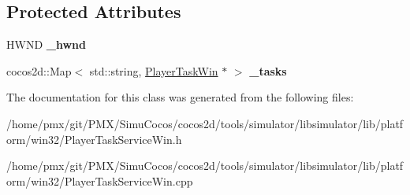 \subsection*{Protected Attributes}
\begin{DoxyCompactItemize}
\item 
\mbox{\label{classPlayerTaskServiceWin_ab4058e50ed13e898d84d9e83a9a33dbf}} 
H\+W\+ND {\bfseries \+\_\+hwnd}
\item 
\mbox{\label{classPlayerTaskServiceWin_a0d4bc832aa5e25b21f968334e3ce92f3}} 
cocos2d\+::\+Map$<$ std\+::string, \hyperlink{classPlayerTaskWin}{Player\+Task\+Win} $\ast$ $>$ {\bfseries \+\_\+tasks}
\end{DoxyCompactItemize}


The documentation for this class was generated from the following files\+:\begin{DoxyCompactItemize}
\item 
/home/pmx/git/\+P\+M\+X/\+Simu\+Cocos/cocos2d/tools/simulator/libsimulator/lib/platform/win32/Player\+Task\+Service\+Win.\+h\item 
/home/pmx/git/\+P\+M\+X/\+Simu\+Cocos/cocos2d/tools/simulator/libsimulator/lib/platform/win32/Player\+Task\+Service\+Win.\+cpp\end{DoxyCompactItemize}
